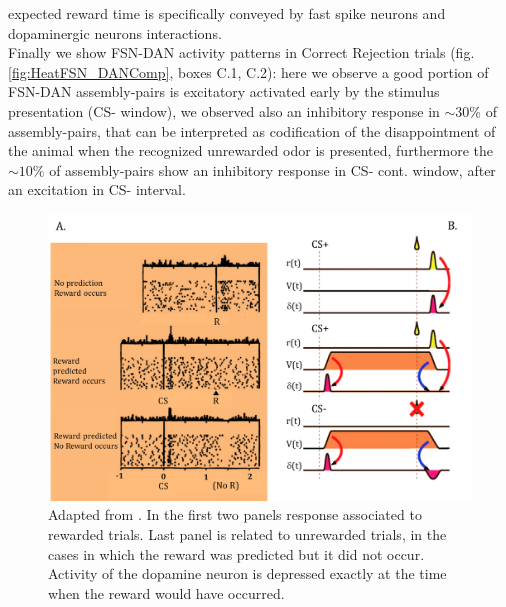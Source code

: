 expected reward time is specifically conveyed by fast spike neurons and dopaminergic neurons interactions.\\ Finally we show FSN-DAN activity patterns in Correct Rejection trials (fig.\ref{fig:HeatFSN_DANComp}, boxes C.1, C.2): here we observe a good portion of FSN-DAN assembly-pairs is excitatory activated early by the stimulus presentation (CS- window), we observed also an inhibitory response in $\sim30\%$ of assembly-pairs, that can be interpreted as codification of the disappointment of the animal when the recognized unrewarded odor is presented, furthermore the $\sim10\%$ of assembly-pairs show an inhibitory response in CS- cont. window, after an excitation in CS- interval.
\begin{figure}
    \centering
    \includegraphics[scale=0.6]{figures/RewardDoyaRLSUM.png}
    \caption{Adapted from \cite{Doya}. In the first two panels response associated to rewarded trials. Last panel is related to unrewarded trials, in the cases in which the reward was predicted but it did not occur. Activity of the dopamine neuron is depressed exactly at the time when the reward would have occurred.}
    \label{fig:RewardDoya}
\end{figure}
